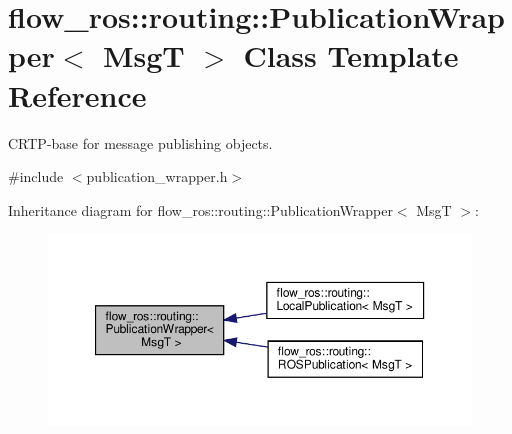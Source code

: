 \hypertarget{classflow__ros_1_1routing_1_1_publication_wrapper}{}\section{flow\+\_\+ros\+:\+:routing\+:\+:Publication\+Wrapper$<$ MsgT $>$ Class Template Reference}
\label{classflow__ros_1_1routing_1_1_publication_wrapper}


C\+R\+T\+P-\/base for message publishing objects.  




{\ttfamily \#include $<$publication\+\_\+wrapper.\+h$>$}



Inheritance diagram for flow\+\_\+ros\+:\+:routing\+:\+:Publication\+Wrapper$<$ MsgT $>$\+:\nopagebreak
\begin{figure}[H]
\begin{center}
\leavevmode
\includegraphics[width=350pt]{classflow__ros_1_1routing_1_1_publication_wrapper__inherit__graph}
\end{center}
\end{figure}
